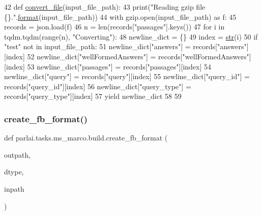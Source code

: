 \begin{DoxyCode}
42 \textcolor{keyword}{def }\hyperlink{namespaceparlai_1_1tasks_1_1ms__marco_1_1build_ac19db5d0ad4ba8559f6aca64f2fe192b}{convert\_file}(input\_file\_path):
43     print(\textcolor{stringliteral}{"Reading gzip file \{\}."}.\hyperlink{namespaceparlai_1_1chat__service_1_1services_1_1messenger_1_1shared__utils_a32e2e2022b824fbaf80c747160b52a76}{format}(input\_file\_path))
44     with gzip.open(input\_file\_path) \textcolor{keyword}{as} f:
45         records = json.load(f)
46     n = len(records[\textcolor{stringliteral}{"passages"}].keys())
47     \textcolor{keywordflow}{for} i \textcolor{keywordflow}{in} tqdm.tqdm(range(n), \textcolor{stringliteral}{"Converting"}):
48         newline\_dict = \{\}
49         index = \hyperlink{namespacegenerate__task__READMEs_a5b88452ffb87b78c8c85ececebafc09f}{str}(i)
50         \textcolor{keywordflow}{if} \textcolor{stringliteral}{"test"} \textcolor{keywordflow}{not} \textcolor{keywordflow}{in} input\_file\_path:
51             newline\_dict[\textcolor{stringliteral}{"answers"}] = records[\textcolor{stringliteral}{"answers"}][index]
52             newline\_dict[\textcolor{stringliteral}{"wellFormedAnswers"}] = records[\textcolor{stringliteral}{"wellFormedAnswers"}][index]
53         newline\_dict[\textcolor{stringliteral}{"passages"}] = records[\textcolor{stringliteral}{"passages"}][index]
54         newline\_dict[\textcolor{stringliteral}{"query"}] = records[\textcolor{stringliteral}{"query"}][index]
55         newline\_dict[\textcolor{stringliteral}{"query\_id"}] = records[\textcolor{stringliteral}{"query\_id"}][index]
56         newline\_dict[\textcolor{stringliteral}{"query\_type"}] = records[\textcolor{stringliteral}{"query\_type"}][index]
57         \textcolor{keywordflow}{yield} newline\_dict
58 
59 
\end{DoxyCode}
\mbox{\label{namespaceparlai_1_1tasks_1_1ms__marco_1_1build_ac3cdd4cc2ccd3e9551ddd0349b94d537}} 
\subsubsection{\texorpdfstring{create\+\_\+fb\+\_\+format()}{create\_fb\_format()}}
{\footnotesize\ttfamily def parlai.\+tasks.\+ms\+\_\+marco.\+build.\+create\+\_\+fb\+\_\+format (\begin{DoxyParamCaption}\item[{}]{outpath,  }\item[{}]{dtype,  }\item[{}]{inpath }\end{DoxyParamCaption})}



